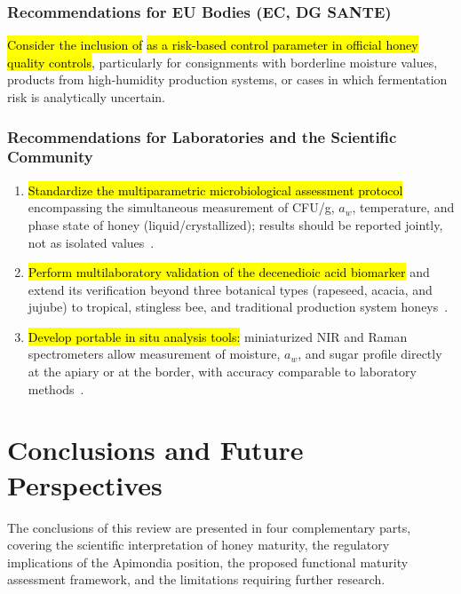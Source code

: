 \documentclass[foods,review,accept,pdftex,moreauthors]{Definitions/mdpi}
\begin{document}
{\subsubsection{Recommendations for EU Bodies (EC, DG SANTE)}


{\hl{Consider the inclusion of}  \hl{as a risk-based control parameter in official honey quality controls}}, particularly for consignments with borderline moisture values, products from high-humidity production systems, or cases in which fermentation risk is analytically uncertain.


\subsubsection{Recommendations for Laboratories and the Scientific Community}

\begin{enumerate}
    \item {\hl{Standardize the multiparametric microbiological
          assessment protocol}} encompassing the simultaneous measurement
          of CFU/g, $a_w$, temperature, and phase state of honey
          (liquid/crystallized); results should be reported
          jointly, not as isolated values~\cite{zamora2006,analytica2020}.
    \item {\hl{Perform multilaboratory validation of the
          decenedioic acid biomarker}} and extend its verification
          beyond three botanical types (rapeseed, acacia, and jujube)
          to tropical, stingless bee, and traditional production
          system honeys~\cite{sun2021}.
    \item {\hl{Develop portable in situ analysis tools:}}
          miniaturized NIR and Raman spectrometers allow
          measurement of moisture, $a_w$, and sugar profile
          directly at the apiary or at the border, with accuracy
          comparable to laboratory
          methods~\cite{honeyid2025,schoder2026}.
\end{enumerate}



 


\section{Conclusions and Future Perspectives}

The conclusions of this review are presented in four complementary parts, covering the scientific interpretation of honey maturity, the regulatory implications of the Apimondia position, the proposed functional maturity assessment framework, and the limitations requiring further research.

}
\end{document}
